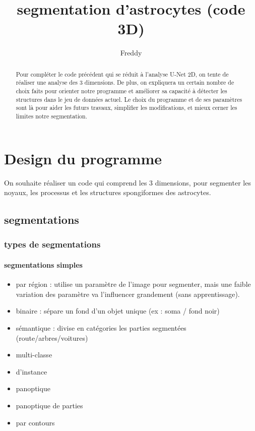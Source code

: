 \documentclass[10pt]{scrartcl}
\title{segmentation d'astrocytes (code 3D)}
\author{Freddy}
\begin{document}
\maketitle

\begin{abstract}
Pour compléter le code précédent qui se réduit à l'analyse U-Net 2D, on tente de réaliser une analyse des 3 dimensions. 
De plus, on expliquera un certain nombre de choix faits pour orienter notre programme et améliorer sa capacité à détecter les structures dans le jeu de données actuel. 
Le choix du programme et de ses paramètres sont là pour aider les futurs travaux, simplifier les modifications, et mieux cerner les limites notre segmentation.

\end{abstract}

\section{Design du programme}

On souhaite réaliser un code qui comprend les 3 dimensions, pour segmenter les noyaux, les processus et les structures spongiformes des astrocytes.

\subsection{segmentations} 
\subsubsection{types de segmentations} 
\paragraph{segmentations simples}
\begin{itemize}
    \item  par région : utilise un paramètre de l'image pour segmenter, mais une faible variation des paramètre va l'influencer grandement (sans apprentissage).
    \item binaire : sépare un fond d'un objet unique (ex : soma / fond noir) 
    \item sémantique : divise en catégories les parties segmentées (route/arbres/voitures)
    \item multi-classe 
    \item d'instance
    \item panoptique
    \item panoptique de parties
    \item par contours
\end{itemize}
\end{document}
